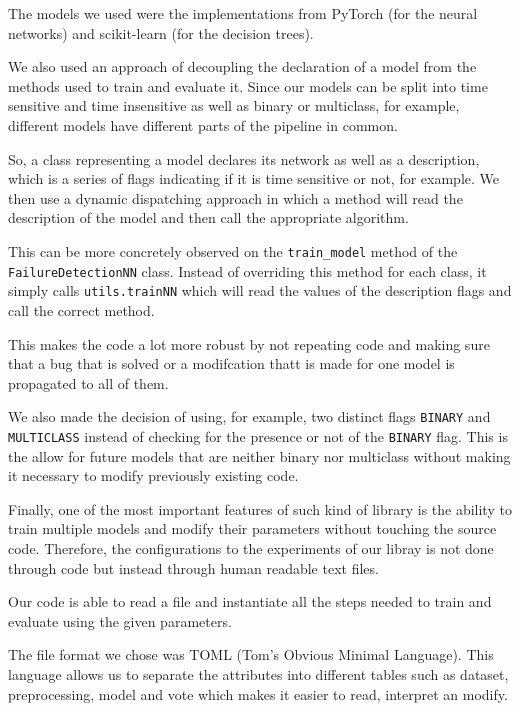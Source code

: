 The models we used were the implementations from PyTorch (for the neural networks) and scikit-learn (for the decision trees).

We also used an approach of decoupling the declaration of a model from the methods used to train and evaluate it.
Since our models can be split into time sensitive and time insensitive as well as binary or multiclass, for example, different models have different parts of the pipeline in common.

So, a class representing a model declares its network as well as a description, which is a series of flags indicating if it is time sensitive or not, for example.
We then use a dynamic dispatching approach in which a method will read the description of the model and then call the appropriate algorithm.

This can be more concretely observed on the \verb|train_model| method of the \\ \verb|FailureDetectionNN| class.
Instead of overriding this method for each class, it simply calls \verb|utils.trainNN| which will read the values of the description flags and call the correct method.

This makes the code a lot more robust by not repeating code and making sure that a bug that is solved or a modifcation thatt is made for one model is propagated to all of them.

We also made the decision of using, for example, two distinct flags \verb|BINARY| and \\ \verb|MULTICLASS| instead of checking for the presence or not of the \verb|BINARY| flag.
This is the allow for future models that are neither binary nor multiclass without making it necessary to modify previously existing code.

Finally, one of the most important features of such kind of library is the ability to train multiple models and modify their parameters without touching the source code.
Therefore, the configurations to the experiments of our libray is not done through code but instead through human readable text files.

Our code is able to read a file and instantiate all the steps needed to train and evaluate using the given parameters.

The file format we chose was TOML (Tom's Obvious Minimal Language).
This language allows us to separate the attributes into different tables such as dataset, preprocessing, model and vote which makes it easier to read, interpret an modify.

